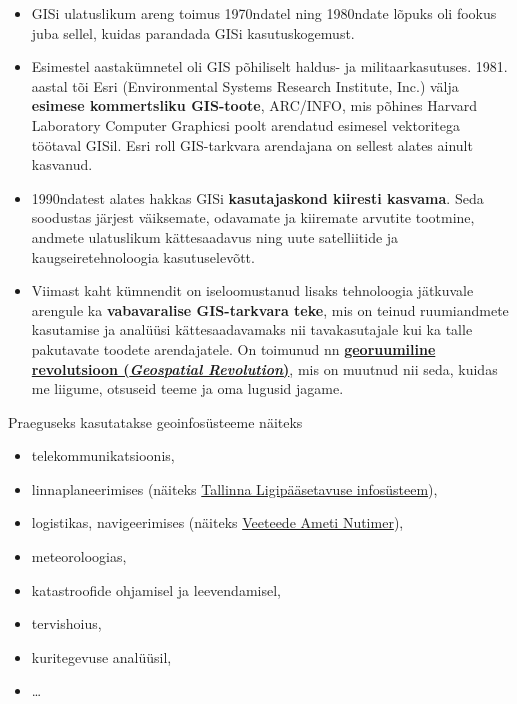 \documentclass[
]{book}
\providecommand{\tightlist}{%
  \setlength{\itemsep}{0pt}\setlength{\parskip}{0pt}}
\begin{document}
\begin{itemize}
\tightlist
\item
  GISi ulatuslikum areng toimus 1970ndatel ning 1980ndate lõpuks oli fookus juba sellel, kuidas parandada GISi kasutuskogemust.\\
\item
  Esimestel aastakümnetel oli GIS põhiliselt haldus- ja militaarkasutuses. 1981. aastal tõi Esri (Environmental Systems Research Institute, Inc.) välja \textbf{esimese kommertsliku GIS-toote}, ARC/INFO, mis põhines Harvard Laboratory Computer Graphicsi poolt arendatud esimesel vektoritega töötaval GISil. Esri roll GIS-tarkvara arendajana on sellest alates ainult kasvanud.\\
\item
  1990ndatest alates hakkas GISi \textbf{kasutajaskond kiiresti kasvama}. Seda soodustas järjest väiksemate, odavamate ja kiiremate arvutite tootmine, andmete ulatuslikum kättesaadavus ning uute satelliitide ja kaugseiretehnoloogia kasutuselevõtt.
\item
  Viimast kaht kümnendit on iseloomustanud lisaks tehnoloogia jätkuvale arengule ka \textbf{vabavaralise GIS-tarkvara teke}, mis on teinud ruumiandmete kasutamise ja analüüsi kättesaadavamaks nii tavakasutajale kui ka talle pakutavate toodete arendajatele. On toimunud nn \textbf{\href{https://www.e-education.psu.edu/maps/l1_p2.html}{georuumiline revolutsioon (\emph{Geospatial Revolution})}}, mis on muutnud nii seda, kuidas me liigume, otsuseid teeme ja oma lugusid jagame.
\end{itemize}

Praeguseks kasutatakse geoinfosüsteeme näiteks

\begin{itemize}
\tightlist
\item
  telekommunikatsioonis,
\item
  linnaplaneerimises (näiteks \href{https://lips.tallinn.ee/est}{Tallinna Ligipääsetavuse infosüsteem}),
\item
  logistikas, navigeerimises (näiteks \href{https://gis.vta.ee/nutimeri/}{Veeteede Ameti Nutimer}),
\item
  meteoroloogias,
\item
  katastroofide ohjamisel ja leevendamisel,
\item
  tervishoius,
\item
  kuritegevuse analüüsil,\\
\item
  \ldots{}
\end{itemize}
\end{document}
